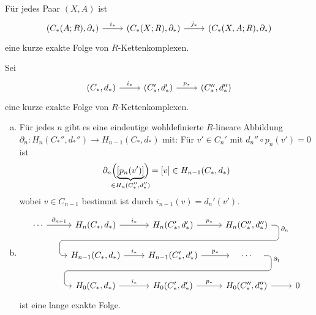 \begin{beispiel}
	Für jedes Paar $(X,A)$ ist 
	\[
		\begin{tikzcd}
			\enbrace*{C_*(A;R),\partial_*} \rar["i_*"] & \enbrace*{C_*(X;R),\partial_*} \rar["j_*"] & \enbrace*{C_*(X,A;R),\partial_*}   
		\end{tikzcd}
	\]
	eine kurze exakte Folge von $R$-Kettenkomplexen.
\end{beispiel}

\begin{satz}[{name={Schlangenlemma}},label=satz:810]
	Sei 
	\[
		\begin{tikzcd}
			(C_*,d_*) \rar["i_*"] & (C_*',d_*') \rar["p_*"] & (C_*'',d_*'')
		\end{tikzcd}
	\]
	eine kurze exakte Folge von $R$-Kettenkomplexen.
	\begin{enumerate}[a)]
		\item Für jedes $n$ gibt es eine eindeutige wohldefinierte $R$-lineare Abbildung $\partial_n \colon H_n(C_*'',d_*'') \to H_{n-1}(C_*,d_*)$ mit:
		Für $v' \in C_n'$ mit $d_n'' \circ p_n(v')=0$ ist 
		\[
			\partial_n \enbrace[\Big]{\underbrace{\benbrace*{p_n(v')}}_{\mathclap{\in H_n(C_*'',d_*'')}} } = [v] \in H_{n-1}(C_*,d_*)
		\]
		wobei $v \in C_{n-1}$ bestimmt ist durch $i_{n-1}(v)= d_n'(v')$.
		\item 
		\[
			\begin{tikzcd}
				\cdots \rar["\partial_{n+1}"] & H_n(C_*,d_*) \rar["i_*"] & 
					H_n(C_*',d_*') \arrow[d, phantom, ""{coordinate, name=Z}] \rar["p_*"] 
						& H_n(C_*'',d_*'') \arrow[dll, "\partial_n" very near start, rounded corners, to path={
																		-- ([xshift=2ex]\tikztostart.east)
																		|- (Z) [near end]\tikztonodes
																		-| ([xshift=-2ex]\tikztotarget.west)
																		-- (\tikztotarget)
																		}] & \\
				& H_{n-1}(C_*,d_*) \rar["i_*"] 
					& H_{n-1}(C_*',d_*') \rar["p_*"] \arrow[d, phantom, ""{coordinate, name=R}]
						& \quad \cdots  \quad \arrow[dll, "\partial_1" very near start, rounded corners, to path={
																		-- ([xshift=2ex]\tikztostart.east)
																		|- (R) [near end]\tikztonodes
																		-| ([xshift=-2ex]\tikztotarget.west)
																		-- (\tikztotarget)
																		}]& \\
				& H_0(C_*,d_*) \rar["i_*"] & H_0(C_*',d_*') \rar["p_*"] & H_0(C_*'',d_*'') \rar & 0
			\end{tikzcd}
		\]
		ist eine lange exakte Folge.
	\end{enumerate}
\end{satz}
